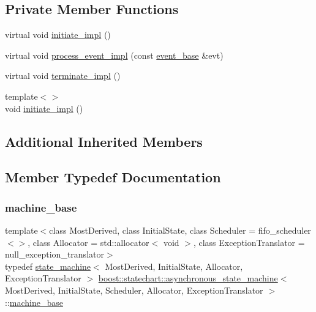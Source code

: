 \subsection*{Private Member Functions}
\begin{DoxyCompactItemize}
\item 
virtual void \mbox{\hyperlink{classboost_1_1statechart_1_1asynchronous__state__machine_a346bde99a27dc391a0c4beb8c728dce0}{initiate\+\_\+impl}} ()
\item 
virtual void \mbox{\hyperlink{classboost_1_1statechart_1_1asynchronous__state__machine_a3e4a4a8910ec610542fc41dba4fd2d04}{process\+\_\+event\+\_\+impl}} (const \mbox{\hyperlink{classboost_1_1statechart_1_1event__base}{event\+\_\+base}} \&evt)
\item 
virtual void \mbox{\hyperlink{classboost_1_1statechart_1_1asynchronous__state__machine_a528bedaf8c4d4b3fefc78984673bf30b}{terminate\+\_\+impl}} ()
\item 
{\footnotesize template$<$$>$ }\\void \mbox{\hyperlink{classboost_1_1statechart_1_1asynchronous__state__machine_a7c4de22b056f8a85f2c163b6c5677f23}{initiate\+\_\+impl}} ()
\end{DoxyCompactItemize}
\subsection*{Additional Inherited Members}


\subsection{Member Typedef Documentation}
\mbox{\label{classboost_1_1statechart_1_1asynchronous__state__machine_a5fb2caf90c443b6517ecb6ce86a672d7}} 
\subsubsection{\texorpdfstring{machine\+\_\+base}{machine\_base}}
{\footnotesize\ttfamily template$<$class Most\+Derived, class Initial\+State, class Scheduler = fifo\+\_\+scheduler$<$$>$, class Allocator = std\+::allocator$<$ void $>$, class Exception\+Translator = null\+\_\+exception\+\_\+translator$>$ \\
typedef \mbox{\hyperlink{classboost_1_1statechart_1_1state__machine}{state\+\_\+machine}}$<$ Most\+Derived, Initial\+State, Allocator, Exception\+Translator $>$ \mbox{\hyperlink{classboost_1_1statechart_1_1asynchronous__state__machine}{boost\+::statechart\+::asynchronous\+\_\+state\+\_\+machine}}$<$ Most\+Derived, Initial\+State, Scheduler, Allocator, Exception\+Translator $>$\+::\mbox{\hyperlink{classboost_1_1statechart_1_1asynchronous__state__machine_a5fb2caf90c443b6517ecb6ce86a672d7}{machine\+\_\+base}}\hspace{0.3cm}{\ttfamily [private]}}

